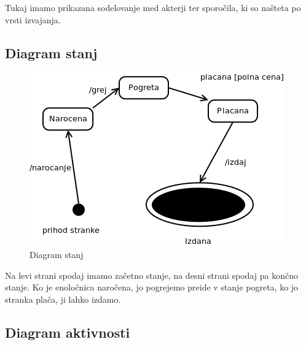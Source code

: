 \documentclass[12pt]{article}
\begin{document}
Tukaj imamo prikazana sodelovanje med akterji ter sporočila, ki so našteta po vrsti izvajanja.

\newpage

\subsection{Diagram stanj}

\begin{figure}[htb]
\begin{center}
\includegraphics[scale=0.5]{stanj.png}
\end{center}
\caption{Diagram stanj}
\label{stanj}
\end{figure}

Na levi strani spodaj imamo začetno stanje, na desni strani spodaj pa končno stanje. Ko je enoločnica naročena,
jo pogrejemo preide v stanje pogreta, ko jo stranka plača, ji lahko izdamo.



\newpage

\subsection{Diagram aktivnosti}
\end{document}
